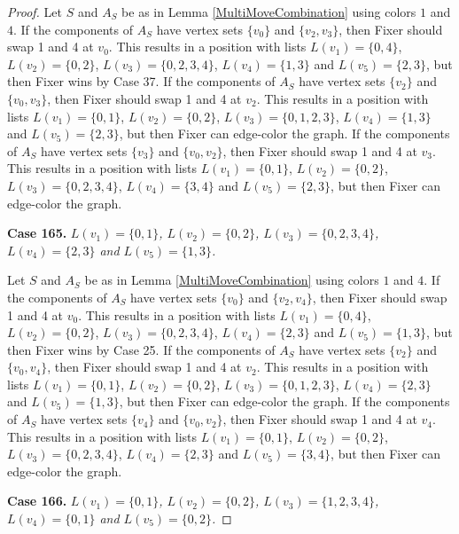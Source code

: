 \documentclass[12pt]{amsart}
\theoremstyle{plain}
\theoremstyle{definition}
\theoremstyle{remark}
\begin{document}
\begin{proof}
Let $S$ and $A_S$ be as in Lemma \ref{MultiMoveCombination} using colors $1$ and $4$. If the components of $A_S$ have vertex sets $\{v_0\}$ and $\{v_2, v_3\}$, then Fixer should swap 1 and 4 at $v_0$. This results in a position with lists $L(v_1) = \{0, 4\}$, $L(v_2) = \{0, 2\}$, $L(v_3) = \{0, 2, 3, 4\}$, $L(v_4) = \{1, 3\}$ and $L(v_5) = \{2, 3\}$, but then Fixer wins by Case 37. If the components of $A_S$ have vertex sets $\{v_2\}$ and $\{v_0, v_3\}$, then Fixer should swap 1 and 4 at $v_2$. This results in a position with lists $L(v_1) = \{0, 1\}$, $L(v_2) = \{0, 2\}$, $L(v_3) = \{0, 1, 2, 3\}$, $L(v_4) = \{1, 3\}$ and $L(v_5) = \{2, 3\}$, but then Fixer can edge-color the graph. If the components of $A_S$ have vertex sets $\{v_3\}$ and $\{v_0, v_2\}$, then Fixer should swap 1 and 4 at $v_3$. This results in a position with lists $L(v_1) = \{0, 1\}$, $L(v_2) = \{0, 2\}$, $L(v_3) = \{0, 2, 3, 4\}$, $L(v_4) = \{3, 4\}$ and $L(v_5) = \{2, 3\}$, but then Fixer can edge-color the graph. 

\noindent\textbf{Case 165.  }\textit{$L(v_1) = \{0, 1\}$, $L(v_2) = \{0, 2\}$, $L(v_3) = \{0, 2, 3, 4\}$, $L(v_4) = \{2, 3\}$ and $L(v_5) = \{1, 3\}$.}

Let $S$ and $A_S$ be as in Lemma \ref{MultiMoveCombination} using colors $1$ and $4$. If the components of $A_S$ have vertex sets $\{v_0\}$ and $\{v_2, v_4\}$, then Fixer should swap 1 and 4 at $v_0$. This results in a position with lists $L(v_1) = \{0, 4\}$, $L(v_2) = \{0, 2\}$, $L(v_3) = \{0, 2, 3, 4\}$, $L(v_4) = \{2, 3\}$ and $L(v_5) = \{1, 3\}$, but then Fixer wins by Case 25. If the components of $A_S$ have vertex sets $\{v_2\}$ and $\{v_0, v_4\}$, then Fixer should swap 1 and 4 at $v_2$. This results in a position with lists $L(v_1) = \{0, 1\}$, $L(v_2) = \{0, 2\}$, $L(v_3) = \{0, 1, 2, 3\}$, $L(v_4) = \{2, 3\}$ and $L(v_5) = \{1, 3\}$, but then Fixer can edge-color the graph. If the components of $A_S$ have vertex sets $\{v_4\}$ and $\{v_0, v_2\}$, then Fixer should swap 1 and 4 at $v_4$. This results in a position with lists $L(v_1) = \{0, 1\}$, $L(v_2) = \{0, 2\}$, $L(v_3) = \{0, 2, 3, 4\}$, $L(v_4) = \{2, 3\}$ and $L(v_5) = \{3, 4\}$, but then Fixer can edge-color the graph. 

\noindent\textbf{Case 166.  }\textit{$L(v_1) = \{0, 1\}$, $L(v_2) = \{0, 2\}$, $L(v_3) = \{1, 2, 3, 4\}$, $L(v_4) = \{0, 1\}$ and $L(v_5) = \{0, 2\}$.}


\end{proof}
\end{document}
